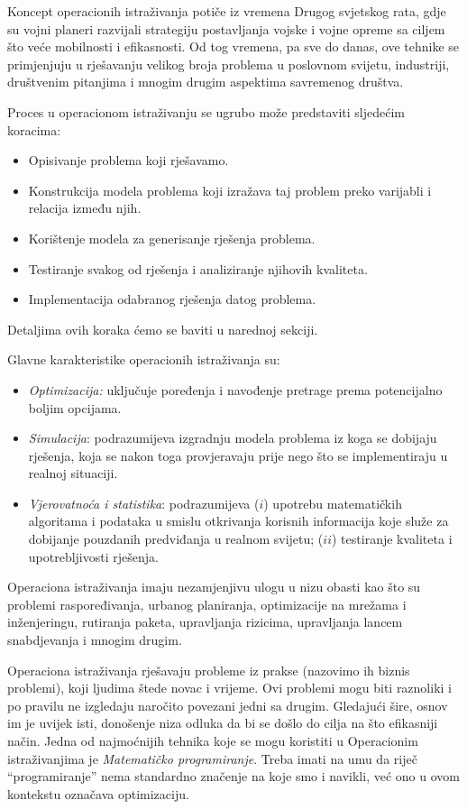 \documentclass[a4paper, utf8, 11pt, colorlinks]{book}
\theoremstyle{definition}
\begin{document}
Koncept operacionih istraživanja potiče iz vremena Drugog svjetskog rata, gdje su vojni planeri razvijali strategiju postavljanja vojske i vojne opreme sa ciljem što veće mobilnosti i efikasnosti. Od tog vremena, pa sve do danas, ove tehnike se primjenjuju u rješavanju velikog broja problema u poslovnom svijetu, industriji, društvenim pitanjima i mnogim drugim aspektima savremenog društva. 

Proces u operacionom istraživanju se ugrubo može predstaviti sljedećim koracima:
\begin{itemize}
    \item Opisivanje problema koji rješavamo.
    \item Konstrukcija modela problema koji izražava taj problem preko varijabli i relacija između njih. 
    \item Korištenje modela za generisanje rješenja problema.
    \item Testiranje svakog od rješenja i analiziranje njihovih  kvaliteta.
    \item Implementacija odabranog rješenja datog problema. 
\end{itemize}
Detaljima ovih koraka ćemo se baviti  u narednoj sekciji.
 
Glavne karakteristike operacionih istraživanja su:
\begin{itemize}
    \item \emph{Optimizacija:} %
     uključuje poređenja i navođenje pretrage prema potencijalno boljim opcijama.
    \item \emph{Simulacija}:  podrazumijeva izgradnju modela problema iz koga se dobijaju rješenja, koja se nakon toga provjeravaju prije nego što se implementiraju u realnoj situaciji.
    \item \emph{Vjerovatnoća i statistika}:  podrazumijeva ($i$) upotrebu matematičkih algoritama i podataka u smislu otkrivanja korisnih informacija koje služe za dobijanje pouzdanih predviđanja u realnom svijetu; ($ii$) testiranje kvaliteta i upotrebljivosti rješenja.
\end{itemize}
 
 Operaciona istraživanja imaju nezamjenjivu ulogu u nizu obasti kao što su problemi raspoređivanja, urbanog planiranja, optimizacije na mrežama i inženjeringu, rutiranja paketa, upravljanja rizicima, upravljanja lancem snabdjevanja i mnogim drugim. 

 Operaciona istraživanja rješavaju probleme iz prakse (nazovimo ih biznis problemi), koji ljudima štede novac i vrijeme. Ovi problemi mogu biti raznoliki i po pravilu ne izgledaju naročito povezani jedni sa drugim. Gledajući šire, osnov  im je uvijek isti, donošenje niza odluka da bi se došlo do cilja na što efikasniji način.
Jedna od najmoćnijih tehnika koje se mogu koristiti u Operacionim istraživanjima je \emph{Matematičko programiranje}. Treba imati na umu da riječ ``programiranje'' nema standardno značenje na koje smo i navikli, već ono u ovom kontekstu označava optimizaciju.   %
\end{document}
